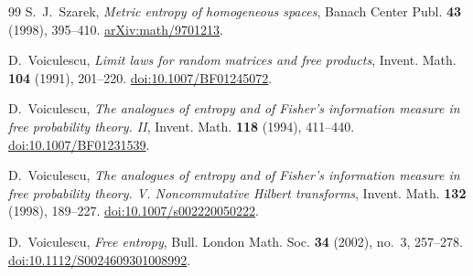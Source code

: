 \begin{thebibliography}{99}
S.~J.~Szarek,
\emph{Metric entropy of homogeneous spaces},
Banach Center Publ. \textbf{43} (1998), 395--410.
\href{https://arxiv.org/abs/math/9701213}{arXiv:math/9701213}.

D.~Voiculescu,
\emph{Limit laws for random matrices and free products},
Invent. Math. \textbf{104} (1991), 201--220.
\href{https://doi.org/10.1007/BF01245072}{doi:10.1007/BF01245072}.

D.~Voiculescu,
\emph{The analogues of entropy and of Fisher's information measure in
free probability theory. II},
Invent. Math. \textbf{118} (1994), 411--440.
\href{https://doi.org/10.1007/BF01231539}{doi:10.1007/BF01231539}.

D.~Voiculescu,
\emph{The analogues of entropy and of Fisher's information measure in
free probability theory. V. Noncommutative Hilbert transforms},
Invent. Math. \textbf{132} (1998), 189--227.
\href{https://doi.org/10.1007/s002220050222}{doi:10.1007/s002220050222}.

D.~Voiculescu,
\emph{Free entropy},
Bull. London Math. Soc. \textbf{34} (2002), no.~3, 257--278.
\href{https://doi.org/10.1112/S0024609301008992}{doi:10.1112/S0024609301008992}.
\end{thebibliography}

